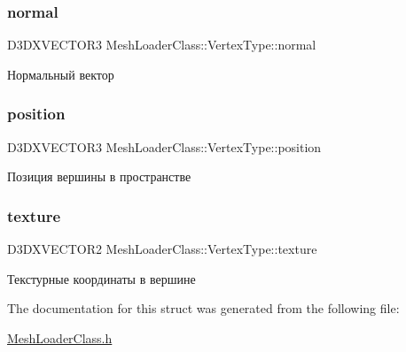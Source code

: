 \subsubsection{\texorpdfstring{normal}{normal}}
{\footnotesize\ttfamily D3\+D\+X\+V\+E\+C\+T\+O\+R3 Mesh\+Loader\+Class\+::\+Vertex\+Type\+::normal}



Нормальный вектор 

\mbox{\label{struct_mesh_loader_class_1_1_vertex_type_a69a2fc58d44c3760cac3754d9a126d24}} 
\subsubsection{\texorpdfstring{position}{position}}
{\footnotesize\ttfamily D3\+D\+X\+V\+E\+C\+T\+O\+R3 Mesh\+Loader\+Class\+::\+Vertex\+Type\+::position}



Позиция вершины в пространстве 

\mbox{\label{struct_mesh_loader_class_1_1_vertex_type_aeab10e7e5c7b6b3e0142de7fccea88a2}} 
\subsubsection{\texorpdfstring{texture}{texture}}
{\footnotesize\ttfamily D3\+D\+X\+V\+E\+C\+T\+O\+R2 Mesh\+Loader\+Class\+::\+Vertex\+Type\+::texture}



Текстурные координаты в вершине 



The documentation for this struct was generated from the following file\+:\begin{DoxyCompactItemize}
\item 
\hyperlink{_mesh_loader_class_8h}{Mesh\+Loader\+Class.\+h}\end{DoxyCompactItemize}
